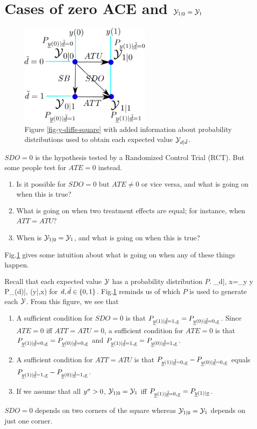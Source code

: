 \section{Cases of zero ACE and ${\cal Y}_{1|0}={\cal Y}_{1}$}
\label{sec-td-ignored}

\begin{figure}[h!]
\centering
\includegraphics[width=2.5in]
{pot-out/y-diffs-square-probs.png}
\caption{Figure \ref{fig-y-diffs-square} 
with added information
about  probability distributions 
used to obtain each expected value ${\cal Y}_{d|{\tilde{d}}}$.}
\label{fig-y-diffs-square-probs}
\end{figure}

$SDO=0$
is the hypothesis 
tested by a Randomized Control Trial (RCT).
But some people
test for $ATE=0$
instead.
\begin{enumerate}
\item 
Is it
possible for $SDO=0$ but $ATE\neq 0$
or vice versa, and
what is going on when this is true?
\item
What is going on when two treatment effects
are equal; for instance, when $ATT=ATU$?
\item
When is ${\cal Y}_{1|0}={\cal Y}_{1}$,
and what is going on when this is  true?
\end{enumerate}
Fig.\ref{fig-y-diffs-square-probs}
gives some 
intuition 
about what is
going on when any of these 
things happen.

Recall that
each expected value ${\cal Y}$ has a probability
distribution $P$.
\beq
\caly_{d|\td, x}=\sum_{y} y P_{\rvy(d)|\rvtd, \rvx}(y|\td,x)
\eeq
for $d, {\tilde{d}}\in \{0,1\}$.
Fig.\ref{fig-y-diffs-square-probs}
reminds us of which $P$
is used to generate each ${\cal Y}$.
From this figure, we see that

\begin{enumerate}
\item
A sufficient
condition for $SDO=0$
is that 
$P_{{\underline{y}}(1)|{\underline{\tilde{d}}}=1, {\underline{x}}}
=
P_{{\underline{y}}(0)|{\underline{\tilde{d}}}=0, {\underline{x}}}$.
Since $ATE=0$ iff 
$ATT=ATU=0$,
a sufficient condition
for $ATE=0$ is that
$P_{{\underline{y}}(1)|{\underline{\tilde{d}}}=0, {\underline{x}}}
=
P_{{\underline{y}}(0)|{\underline{\tilde{d}}}=0, {\underline{x}}}$
and
$P_{{\underline{y}}(1)|{\underline{\tilde{d}}}=1, {\underline{x}}}
=
P_{{\underline{y}}(0)|{\underline{\tilde{d}}}=1, {\underline{x}}}$.
\item
A sufficient condition for
$ATT=ATU$
is that 
$P_{{\underline{y}}(1)|{\underline{\tilde{d}}}=0, {\underline{x}}}
-
P_{{\underline{y}}(0)|{\underline{\tilde{d}}}=0, {\underline{x}}}$
equals
$P_{{\underline{y}}(1)|{\underline{\tilde{d}}}=1, {\underline{x}}}
-
P_{{\underline{y}}(0)|{\underline{\tilde{d}}}=1, {\underline{x}}}$.
\item
If we assume that
all $y^\sigma>0$, ${\cal Y}_{1|0}={\cal Y}_{1}$
iff 
$P_{{\underline{y}}(1)|{\underline{\tilde{d}}}=0, {\underline{x}}}=
P_{{\underline{y}}(1)| {\underline{x}}}$.
\end{enumerate}
$SDO=0$
depends on two corners
of the square
whereas  ${\cal Y}_{1|0}={\cal Y}_{1}$
depends on just one corner.


